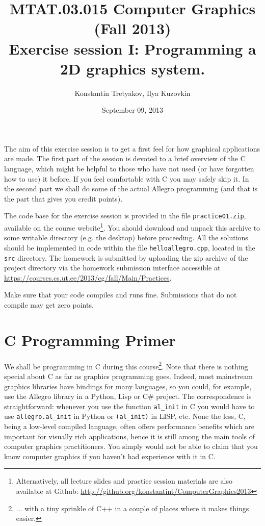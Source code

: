 \documentclass{article}
\begin{document}
\title{MTAT.03.015 Computer Graphics (Fall 2013)\\
Exercise session I: Programming a 2D graphics system.}
\author{Konstantin Tretyakov, Ilya Kuzovkin}
\date{September 09, 2013}
\maketitle

The aim of this exercise session is to get a first feel for how graphical applications are made. The first part of the session is devoted to a brief overview of the C language, which might be helpful to those who have not used (or have forgotten how to use) it before. If you feel comfortable with C you may safely skip it. In the second part we shall do some of the actual Allegro programming (and that is the part that gives you credit points).

The code base for the exercise session is provided in the file \texttt{practice01.zip}, available on the course website\footnote{Alternatively, all lecture slides and practice session materials are also available at Github: \url{http://github.org/konstantint/ComputerGraphics2013}}. You should download and unpack this archive to some writable directory (e.g. the desktop) before proceeding. All the solutions should be implemented in code within the file \texttt{helloallegro.cpp}, located in the \texttt{src} directory. The homework is submitted by uploading the zip archive of the project directory via the homework submission interface accessible at \url{https://courses.cs.ut.ee/2013/cg/fall/Main/Practices}.

Make sure that your code compiles and runs fine. Submissions that do not compile may get zero points.


\section{C Programming Primer}

We shall be programming in C during this course\footnote{... with a tiny sprinkle of C++ in a couple of places where it makes things easier.}. Note that there is nothing special about C as far as graphics programming goes. Indeed, most mainstream graphics libraries have bindings for many languages, so you could, for example, use the Allegro library in a Python, Lisp or C\# project. The correspondence is straightforward: whenever you use the function \verb#al_init# in C you would have to use \verb#allegro.al_init# in Python or \verb#(al_init)# in LISP, etc. None the less, C, being a low-level compiled language, often offers performance benefits which are important for visually rich applications, hence it is still among the main tools of computer graphics practitioners. You simply would not be able to claim that you know computer graphics if you haven't had experience with it in C.
\end{document}
